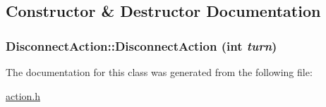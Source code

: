 \subsection{Constructor \& Destructor Documentation}
\hypertarget{classDisconnectAction_7b9d0cdf0f6baac981a67952aa595014}{
\subsubsection[{DisconnectAction}]{\setlength{\rightskip}{0pt plus 5cm}DisconnectAction::DisconnectAction (int {\em turn})}}
\label{classDisconnectAction_7b9d0cdf0f6baac981a67952aa595014}




The documentation for this class was generated from the following file:\begin{CompactItemize}
\item 
\hyperlink{action_8h}{action.h}\end{CompactItemize}
